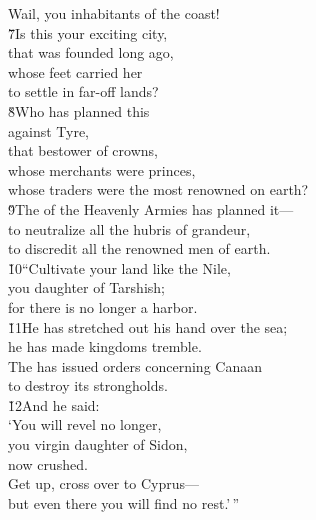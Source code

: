 \begin{poetry}
\poemll    Wail, you inhabitants of the coast! \\
\poeml \v{7}Is this your exciting city, \\
\poemll    that was founded long ago, \\
\poeml whose feet carried her \\
\poemll    to settle in far-off lands? \\
\poeml \v{8}Who has planned this \\
\poemll    against Tyre, \\
\poemlll       that bestower of crowns, \\
\poeml whose merchants were princes, \\
\poemll    whose traders were the most renowned on earth? \\
\poeml \v{9}The  of the Heavenly Armies has planned it--- \\
\poemll    to neutralize all the hubris of grandeur, \\
\poemlll       to discredit all the renowned men of earth. \\
\poeml \v{10}``Cultivate your land like the Nile, \\
\poemll    you daughter of Tarshish; \\
\poemlll       for there is no longer a harbor. \\
\poeml \v{11}He has stretched out his hand over the sea; \\
\poemll    he has made kingdoms tremble. \\
\poeml The  has issued orders concerning Canaan \\
\poemll    to destroy its strongholds. \\
\poeml \v{12}And he said: \\
\poeml `You will revel no longer, \\
\poemll    you virgin daughter of Sidon, \\
\poemlll       now crushed. \\
\poeml Get up, cross over to Cyprus--- \\
\poemll    but even there you will find no rest.'\,''
\end{poetry}

